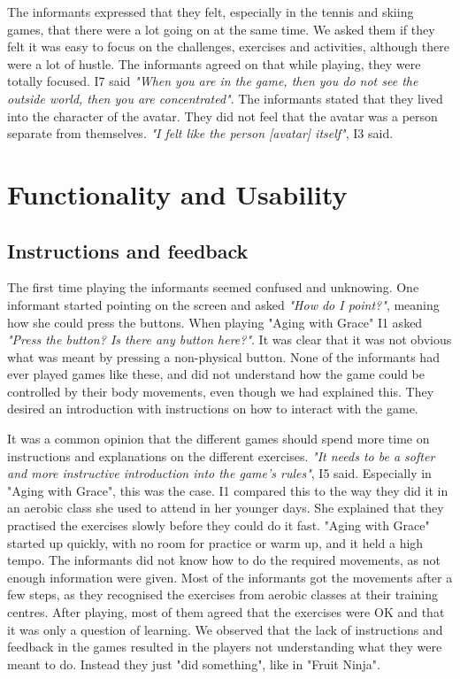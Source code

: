 The informants expressed that they felt, especially in the tennis and skiing games, that there were a lot going on at the same time. We asked them if they felt it was easy to focus on the challenges, exercises and activities, although there were a lot of hustle. The informants agreed on that while playing, they were totally focused. I7 said \emph{"When you are in the game, then you do not see the outside world, then you are concentrated"}. The informants stated that they lived into the character of the avatar. They did not feel that the avatar was a person separate from themselves. \emph{"I felt like the person [avatar] itself"}, I3 said. 

\section{Functionality and Usability}
\subsection{Instructions and feedback}
The first time playing the informants seemed confused and unknowing. One informant started pointing on the screen and asked \emph{"How do I point?"}, meaning how she could press the buttons. When playing "Aging with Grace" I1 asked \emph{"Press the button? Is there any button here?"}. It was clear that it was not obvious what was meant by pressing a non-physical button. None of the informants had ever played games like these, and did not understand how the game could be controlled by their body movements, even though we had explained this. They desired an introduction with instructions on how to interact with the game.

It was a common opinion that the different games should spend more time on instructions and explanations on the different exercises. \emph{"It needs to be a softer and more instructive introduction into the game's rules"}, I5 said. Especially in "Aging with Grace", this was the case. I1 compared this to the way they did it in an aerobic class she used to attend in her younger days. She explained that they practised the exercises slowly before they could do it fast. "Aging with Grace" started up quickly, with no room for practice or warm up, and it held a high tempo. The informants did not know how to do the required movements, as not enough information were given. Most of the informants got the movements after a few steps, as they recognised the exercises from aerobic classes at their training centres. After playing, most of them agreed that the exercises were OK and that it was only a question of learning. We observed that the lack of instructions and feedback in the games resulted in the players not understanding what they were meant to do. Instead they just "did something", like in "Fruit Ninja". 

